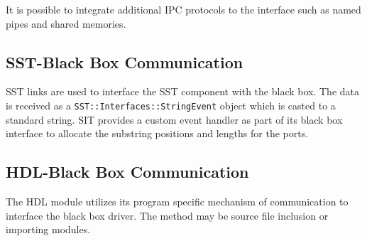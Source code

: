 \documentclass{article}
\begin{document}
    It is possible to integrate additional IPC protocols to the interface such as named pipes and
    shared memories.

    \subsection{SST-Black Box Communication}
    SST links are used to interface the SST component with the black box. The data is received as a
    \lstinline{SST::Interfaces::StringEvent} object which is casted to a standard string. SIT
    provides a custom event handler as part of its black box interface to allocate the substring
    positions and lengths for the ports.

    \subsection{HDL-Black Box Communication}
    The HDL module utilizes its program specific mechanism of communication to interface the black
    box driver. The method may be source file inclusion or importing modules.




\end{document}
